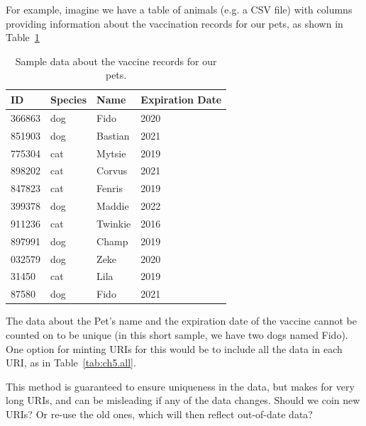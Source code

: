 For example, imagine  we have a table of animals (e.g. a CSV file) with columns
providing information about the vaccination records for our pets, as shown in Table~\ref{tab:ch5.pets}

\begin{table}
    \centering
    \begin{tabular}{|l l l l|}
    \hline
    ID&Species&Name&Expiration Date \\
    \hline\hline
366863&dog&Fido&2020 \\
851903&dog&Bastian&2021 \\
775304&cat&Mytsie&2019 \\
898202&cat&Corvus&2021 \\
847823&cat&Fenris&2019 \\
399378&dog&Maddie&2022 \\
911236&cat&Twinkie&2016 \\
897991&dog&Champ&2019 \\
032579&dog&Zeke&2020 \\
31450&cat&Lila&2019 \\
87580&dog&Fido&2021 \\
\hline
    \end{tabular}
    \caption{Sample data about the vaccine records for our pets. }
    \label{tab:ch5.pets}
\end{table}


The data about the Pet's name and the expiration date of the vaccine cannot be counted on to be  unique
(in this short sample, we have two dogs named Fido).  One option for minting URIs for this would be to include all the data in each URI, as in Table~\ref{tab:ch5.all}.

This method is guaranteed to ensure uniqueness in the data, but makes for very long URIs, and can be misleading if any of the data changes.  Should we coin new URIs?  Or re-use the old ones, which will then reflect out-of-date data?

